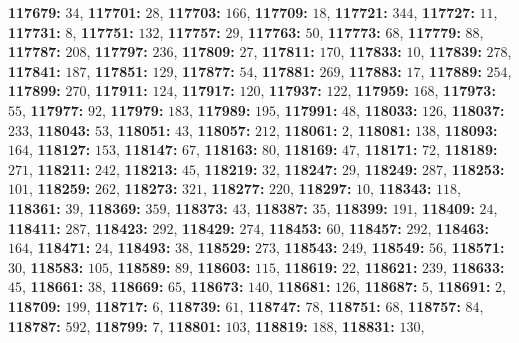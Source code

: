 \textsf{\bfseries 117679:} $34$, \textsf{\bfseries 117701:} $28$, \textsf{\bfseries 117703:} $166$, \textsf{\bfseries 117709:} $18$, \textsf{\bfseries 117721:} $344$, \textsf{\bfseries 117727:} $11$, \textsf{\bfseries 117731:} $8$, \textsf{\bfseries 117751:} $132$, \textsf{\bfseries 117757:} $29$, \textsf{\bfseries 117763:} $50$, \textsf{\bfseries 117773:} $68$, \textsf{\bfseries 117779:} $88$, \textsf{\bfseries 117787:} $208$, \textsf{\bfseries 117797:} $236$, \textsf{\bfseries 117809:} $27$, \textsf{\bfseries 117811:} $170$, \textsf{\bfseries 117833:} $10$, \textsf{\bfseries 117839:} $278$, \textsf{\bfseries 117841:} $187$, \textsf{\bfseries 117851:} $129$, \textsf{\bfseries 117877:} $54$, \textsf{\bfseries 117881:} $269$, \textsf{\bfseries 117883:} $17$, \textsf{\bfseries 117889:} $254$, \textsf{\bfseries 117899:} $270$, \textsf{\bfseries 117911:} $124$, \textsf{\bfseries 117917:} $120$, \textsf{\bfseries 117937:} $122$, \textsf{\bfseries 117959:} $168$, \textsf{\bfseries 117973:} $55$, \textsf{\bfseries 117977:} $92$, \textsf{\bfseries 117979:} $183$, \textsf{\bfseries 117989:} $195$, \textsf{\bfseries 117991:} $48$, \textsf{\bfseries 118033:} $126$, \textsf{\bfseries 118037:} $233$, \textsf{\bfseries 118043:} $53$, \textsf{\bfseries 118051:} $43$, \textsf{\bfseries 118057:} $212$, \textsf{\bfseries 118061:} $2$, \textsf{\bfseries 118081:} $138$, \textsf{\bfseries 118093:} $164$, \textsf{\bfseries 118127:} $153$, \textsf{\bfseries 118147:} $67$, \textsf{\bfseries 118163:} $80$, \textsf{\bfseries 118169:} $47$, \textsf{\bfseries 118171:} $72$, \textsf{\bfseries 118189:} $271$, \textsf{\bfseries 118211:} $242$, \textsf{\bfseries 118213:} $45$, \textsf{\bfseries 118219:} $32$, \textsf{\bfseries 118247:} $29$, \textsf{\bfseries 118249:} $287$, \textsf{\bfseries 118253:} $101$, \textsf{\bfseries 118259:} $262$, \textsf{\bfseries 118273:} $321$, \textsf{\bfseries 118277:} $220$, \textsf{\bfseries 118297:} $10$, \textsf{\bfseries 118343:} $118$, \textsf{\bfseries 118361:} $39$, \textsf{\bfseries 118369:} $359$, \textsf{\bfseries 118373:} $43$, \textsf{\bfseries 118387:} $35$, \textsf{\bfseries 118399:} $191$, \textsf{\bfseries 118409:} $24$, \textsf{\bfseries 118411:} $287$, \textsf{\bfseries 118423:} $292$, \textsf{\bfseries 118429:} $274$, \textsf{\bfseries 118453:} $60$, \textsf{\bfseries 118457:} $292$, \textsf{\bfseries 118463:} $164$, \textsf{\bfseries 118471:} $24$, \textsf{\bfseries 118493:} $38$, \textsf{\bfseries 118529:} $273$, \textsf{\bfseries 118543:} $249$, \textsf{\bfseries 118549:} $56$, \textsf{\bfseries 118571:} $30$, \textsf{\bfseries 118583:} $105$, \textsf{\bfseries 118589:} $89$, \textsf{\bfseries 118603:} $115$, \textsf{\bfseries 118619:} $22$, \textsf{\bfseries 118621:} $239$, \textsf{\bfseries 118633:} $45$, \textsf{\bfseries 118661:} $38$, \textsf{\bfseries 118669:} $65$, \textsf{\bfseries 118673:} $140$, \textsf{\bfseries 118681:} $126$, \textsf{\bfseries 118687:} $5$, \textsf{\bfseries 118691:} $2$, \textsf{\bfseries 118709:} $199$, \textsf{\bfseries 118717:} $6$, \textsf{\bfseries 118739:} $61$, \textsf{\bfseries 118747:} $78$, \textsf{\bfseries 118751:} $68$, \textsf{\bfseries 118757:} $84$, \textsf{\bfseries 118787:} $592$, \textsf{\bfseries 118799:} $7$, \textsf{\bfseries 118801:} $103$, \textsf{\bfseries 118819:} $188$, \textsf{\bfseries 118831:} $130$, 
